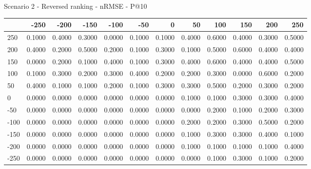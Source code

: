 Scenario 2 - Reversed ranking - nRMSE - P@10
\begin{tabular}{lrrrrrrrrrrr}
\toprule
{} &   -250 &   -200 &   -150 &   -100 &   -50  &    0   &    50  &    100 &    150 &    200 &    250 \\
\midrule
 250 & 0.1000 & 0.4000 & 0.3000 & 0.0000 & 0.1000 & 0.1000 & 0.4000 & 0.6000 & 0.4000 & 0.3000 & 0.5000 \\
 200 & 0.4000 & 0.2000 & 0.5000 & 0.2000 & 0.1000 & 0.3000 & 0.1000 & 0.5000 & 0.6000 & 0.4000 & 0.4000 \\
 150 & 0.0000 & 0.2000 & 0.1000 & 0.4000 & 0.1000 & 0.3000 & 0.4000 & 0.6000 & 0.4000 & 0.4000 & 0.5000 \\
 100 & 0.1000 & 0.3000 & 0.2000 & 0.3000 & 0.4000 & 0.2000 & 0.2000 & 0.3000 & 0.0000 & 0.6000 & 0.2000 \\
 50  & 0.4000 & 0.1000 & 0.1000 & 0.2000 & 0.1000 & 0.3000 & 0.3000 & 0.5000 & 0.2000 & 0.3000 & 0.2000 \\
 0   & 0.0000 & 0.0000 & 0.0000 & 0.0000 & 0.0000 & 0.0000 & 0.1000 & 0.1000 & 0.3000 & 0.3000 & 0.4000 \\
-50  & 0.0000 & 0.0000 & 0.0000 & 0.0000 & 0.0000 & 0.0000 & 0.0000 & 0.2000 & 0.1000 & 0.2000 & 0.3000 \\
-100 & 0.0000 & 0.0000 & 0.0000 & 0.0000 & 0.0000 & 0.0000 & 0.2000 & 0.2000 & 0.3000 & 0.5000 & 0.2000 \\
-150 & 0.0000 & 0.0000 & 0.0000 & 0.0000 & 0.0000 & 0.0000 & 0.1000 & 0.3000 & 0.3000 & 0.4000 & 0.1000 \\
-200 & 0.0000 & 0.0000 & 0.0000 & 0.0000 & 0.0000 & 0.0000 & 0.1000 & 0.1000 & 0.1000 & 0.1000 & 0.4000 \\
-250 & 0.0000 & 0.0000 & 0.0000 & 0.0000 & 0.0000 & 0.0000 & 0.0000 & 0.1000 & 0.3000 & 0.1000 & 0.2000 \\
\bottomrule
\end{tabular}

